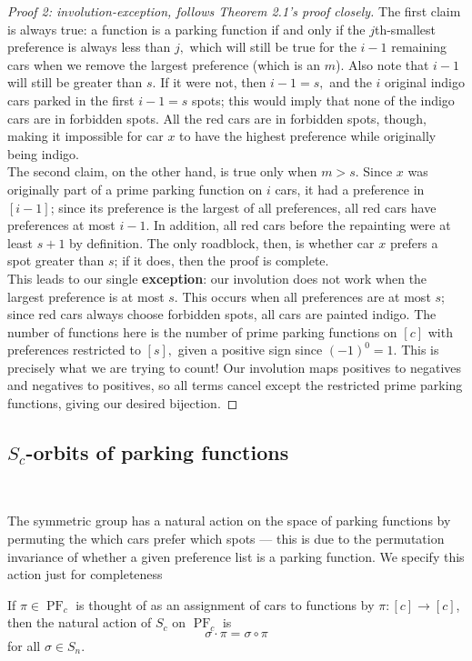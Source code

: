 \begin{proof}[Proof 2: involution-exception, follows Theorem 2.1's proof closely]
    The first claim is always true: a function is a parking function if and only if the $j$th-smallest preference is always less than $j,$ which will still be true for the $i-1$ remaining cars when we remove the largest preference (which is an $m$). Also note that $i-1$ will still be greater than $s$. If it were not, then $i-1=s,$ and the $i$ original indigo cars parked in the first $i-1=s$ spots; this would imply that none of the indigo cars are in forbidden spots. All the red cars are in forbidden spots, though, making it impossible for car $x$ to have the highest preference while originally being indigo.\\

    The second claim, on the other hand, is true only when $m>s.$ Since $x$ was originally part of a prime parking function on $i$ cars, it had a preference in $[i-1]$; since its preference is the largest of all preferences, all red cars have preferences at most $i-1.$ In addition, all red cars before the repainting were at least $s+1$ by definition. The only roadblock, then, is whether car $x$ prefers a spot greater than $s$; if it does, then the proof is complete.\\

    This leads to our single \textbf{exception}: our involution does not work when the largest preference is at most $s.$ This occurs when all preferences are at most $s$; since red cars always choose forbidden spots, all cars are painted indigo. The number of functions here is the number of prime parking functions on $[c]$ with preferences restricted to $[s],$ given a positive sign since $(-1)^0=1.$ This is precisely what we are trying to count! Our involution maps positives to negatives and negatives to positives, so all terms cancel except the restricted prime parking functions, giving our desired bijection.
\end{proof}

\subsection*{$S_{c}$-orbits of parking functions}~

The symmetric group has a natural action on the space of parking functions by permuting the which cars prefer which spots --- this is due to the permutation invariance of whether a given preference list is a parking function. We specify this action just for completeness

\begin{definition}
	If $\pi \in \operatorname{PF}_{c}$ is thought of as an assignment of cars to functions by $\pi : [c] \to [c]$, then the natural action of $S_{c}$ on $\operatorname{PF}_{c}$ is 
	\[
		\sigma \cdot \pi = \sigma \circ \pi
	\]
	for all $\sigma \in S_{n}$. 
\end{definition}

